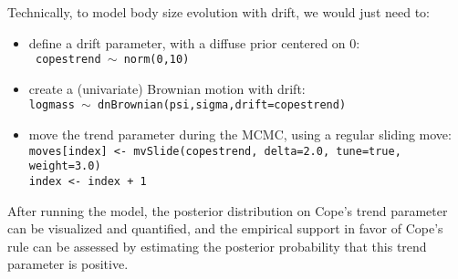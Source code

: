\documentclass[usletter]{article}
\newcommand{\cmd}[1]{\texttt{#1}}
\begin{document}
Technically, to model body size evolution with drift, we would just need to:
\begin{itemize}
\item
define a drift parameter, with a diffuse prior centered on 0:
\\
\cmd{
copestrend $\sim$ norm(0,10)
}
\item
create a (univariate) Brownian motion with drift:
\\
\cmd{logmass $\sim$ dnBrownian(psi,sigma,drift=copestrend)}
\item
move the trend parameter during the MCMC, using a regular sliding move:
\\
\cmd{moves[index] <- mvSlide(copestrend, delta=2.0, tune=true, weight=3.0)
\\
index <- index + 1}
\end{itemize}
After running the model, the posterior distribution on Cope's trend parameter can be visualized and quantified, and the empirical support in favor of Cope's rule can be assessed by estimating the posterior probability that this trend parameter is positive.





\end{document}
